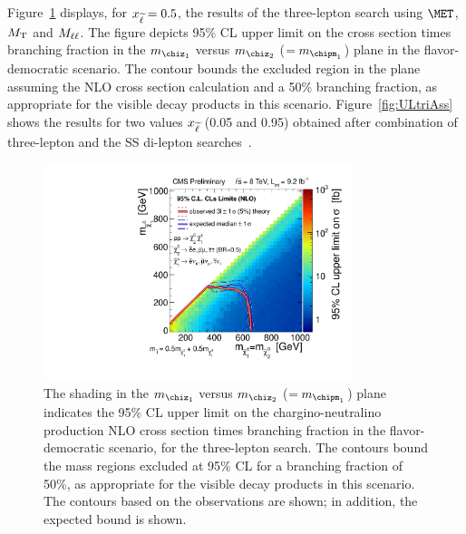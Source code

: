 Figure~\ref{fig:ULtriA} displays, for $x_{\widetilde{\ell}} = 0.5$, 
the results of the three-lepton search using $\MET$, $M_\mathrm{T}$ and $M_{\ell\ell}$. 
The figure depicts 95\% CL upper limit on the cross section times branching fraction in the $m_{\chiz_1}$
versus $m_{\chiz_2}$ ($=m_{\chipm_1}$) plane in the flavor-democratic scenario.
The contour bounds the excluded region in the plane assuming the NLO cross section
calculation and a 50\% branching fraction, as appropriate for the visible decay products in this scenario.
Figure~\ref{fig:ULtriAss} shows the results for two values $x_{\widetilde{\ell}}$ (0.05 and 0.95)
obtained after combination of three-lepton and the SS di-lepton searches~\cite{AN-2012:330}.
\begin{figure}[!p]
\begin{center}
\includegraphics[width=0.8\textwidth]{plots/exclusions/exclusion_TChiSlepSnu_2i_0_5.pdf} 
\caption{
The shading in the $m_{\chiz_1}$ versus $m_{\chiz_2}$
($=m_{\chipm_1}$) plane indicates the 95\% CL upper limit on the
chargino-neutralino production NLO cross section times branching fraction
in the flavor-democratic scenario, for the 
three-lepton search.  The contours bound the mass regions excluded at 95\%
CL for a branching fraction of 50\%, as appropriate for the visible
decay products in this scenario. The contours based on the
observations are shown; in addition, the expected bound is shown. }
\label{fig:ULtriA}
\end{center}
\end{figure}
